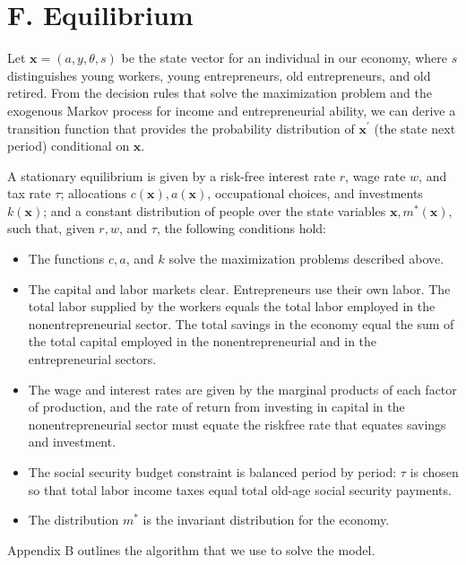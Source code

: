 \documentclass[10pt]{article}
\begin{document}
\section*{F. Equilibrium}
Let $\boldsymbol{x}=(a, y, \theta, s)$ be the state vector for an individual in our economy, where $s$ distinguishes young workers, young entrepreneurs, old entrepreneurs, and old retired. From the decision rules that solve the maximization problem and the exogenous Markov process for income and entrepreneurial ability, we can derive a transition function that provides the probability distribution of $\boldsymbol{x}^{\prime}$ (the state next period) conditional on $\boldsymbol{x}$.

A stationary equilibrium is given by a risk-free interest rate $r$, wage rate $w$, and tax rate $\tau$; allocations $c(\boldsymbol{x}), a(\boldsymbol{x})$, occupational choices, and investments $k(\boldsymbol{x})$; and a constant distribution of people over the state variables $\boldsymbol{x}, m^{*}(\boldsymbol{x})$, such that, given $r, w$, and $\tau$, the following conditions hold:

\begin{itemize}
  \item The functions $c, a$, and $k$ solve the maximization problems described above.
  \item The capital and labor markets clear. Entrepreneurs use their own labor. The total labor supplied by the workers equals the total labor employed in the nonentrepreneurial sector. The total savings in the economy equal the sum of the total capital employed in the nonentrepreneurial and in the entrepreneurial sectors.
  \item The wage and interest rates are given by the marginal products of each factor of production, and the rate of return from investing in capital in the nonentrepreneurial sector must equate the riskfree rate that equates savings and investment.
  \item The social security budget constraint is balanced period by period: $\tau$ is chosen so that total labor income taxes equal total old-age social security payments.
  \item The distribution $m^{*}$ is the invariant distribution for the economy.
\end{itemize}

Appendix B outlines the algorithm that we use to solve the model.
\end{document}
